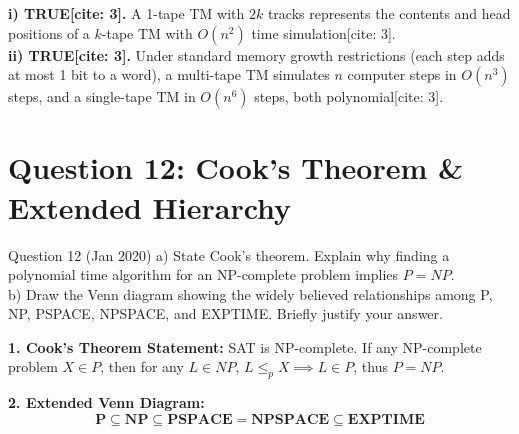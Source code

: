 \documentclass[11pt,a4paper]{article}
\begin{document}
\begin{solutionbox}
\textbf{i) TRUE[cite: 3].} A 1-tape TM with $2k$ tracks represents the contents and head positions of a $k$-tape TM with $O(n^2)$ time simulation[cite: 3]. \\
\textbf{ii) TRUE[cite: 3].} Under standard memory growth restrictions (each step adds at most 1 bit to a word), a multi-tape TM simulates $n$ computer steps in $O(n^3)$ steps, and a single-tape TM in $O(n^6)$ steps, both polynomial[cite: 3].
\end{solutionbox}

\section{Question 12: Cook's Theorem \& Extended Hierarchy}
\begin{questionbox}{Question 12 (Jan 2020)}
a) State Cook's theorem. Explain why finding a polynomial time algorithm for an NP-complete problem implies $P = NP$. \\
b) Draw the Venn diagram showing the widely believed relationships among P, NP, PSPACE, NPSPACE, and EXPTIME. Briefly justify your answer.
\end{questionbox}

\begin{solutionbox}
\textbf{1. Cook's Theorem Statement:}
SAT is NP-complete. If any NP-complete problem $X \in P$, then for any $L \in NP$, $L \le_p X \implies L \in P$, thus $P = NP$.

\textbf{2. Extended Venn Diagram:}
$$\mathbf{P \subseteq NP \subseteq PSPACE = NPSPACE \subseteq EXPTIME}$$
\begin{center}
\end{center}
\end{solutionbox}

\end{document}
